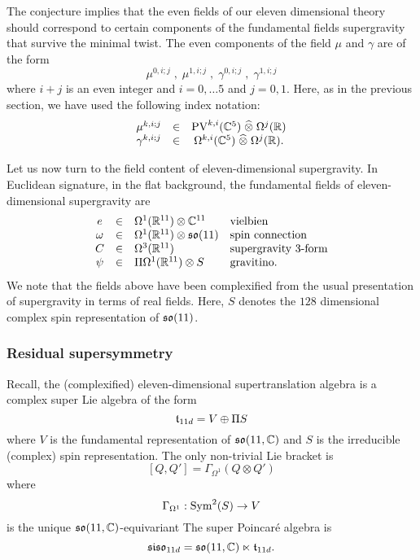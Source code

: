 \documentclass[11pt]{amsart}
\def\pv{{\rm PV}}
\begin{document}
The conjecture implies that the even fields of our eleven dimensional theory should correspond to certain components of the fundamental fields supergravity that survive the minimal twist.
The even components of the field $\mu$ and $\gamma$ are of the form
\[
  \mu^{0, i ; j} \; , \; \mu^{1, i ; j} \; , \; \gamma^{0, i ; j} \; , \; \gamma^{1, i ; j}
\]
where $i+j$ is an even integer and $i = 0,\ldots 5$ and $j=0,1$.
Here, as in the previous section, we have used the following index notation:
\[
  \begin{array}{ccccc}
    \mu^{k, i ; j} & \in & \pv^{k,i} (\CC^5) \; \Hat{\otimes} \; \Omega^j(\RR) \\
    \gamma^{k, i ; j} & \in & \Omega^{k,i}(\CC^5) \; \Hat{\otimes} \; \Omega^j(\RR).
  \end{array}
\]

Let us now turn to the field content of eleven-dimensional supergravity.
In Euclidean signature, in the flat background, the fundamental fields of eleven-dimensional supergravity are
\[
  \begin{array}{ccll}
    e & \in & \Omega^1(\mathbb R^{11}) \otimes \mathbb C^{11} & \mbox{vielbien} \\
    \omega & \in & \Omega^1(\mathbb R^{11}) \otimes \mathfrak s \mathfrak o(11) & \mbox{spin connection} \\
    C & \in & \Omega^3(\mathbb R^{11}) & \mbox{supergravity $3$-form} \\
    \psi & \in & \Pi \Omega^1(\mathbb R^{11}) \otimes S & \mbox{gravitino} .
  \end{array}
\]
We note that the fields above have been complexified from the usual presentation of supergravity in terms of real fields.
Here, $S$ denotes the $128$ dimensional complex spin representation of $\mathfrak s \mathfrak o(11)$.

\subsubsection{Residual supersymmetry}

\def\m2{\mathfrak{m}2\mathfrak{brane}}
\def\susy{\mathfrak{susy}}
\def\so{\mathfrak{so}}
\def\siso{\mathfrak{siso}}
\def\fsl{\mathfrak{sl}}

Recall, the (complexified) eleven-dimensional supertranslation algebra is a complex super Lie algebra of the form
\[
  \mathfrak t_{11d} = V \oplus \Pi S
\]
where $V$ is the fundamental representation of $\so(11 , \CC)$ and $S$ is the irreducible (complex) spin representation.
The only non-trivial Lie bracket is
\[
  [Q, Q'] = \Gamma_{\Omega^1}(Q \otimes Q')
\]
where
\[
  \Gamma_{\Omega^1} : \operatorname{Sym}^2(S) \to V 
\]
is the unique $\so(11, \CC)$-equivariant 
The super Poincar\'{e} algebra is
\[
  \siso_{11d} = \so(11 , \CC) \ltimes \ft_{11d} .
\]
\end{document}
